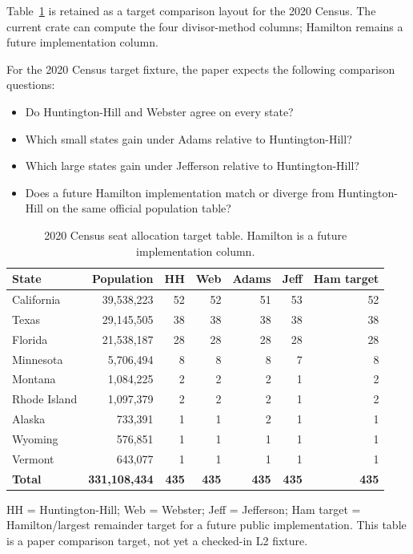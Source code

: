 \label{sec:comparison}

Table~\ref{tab:all-methods-2020} is retained as a target comparison layout for
the 2020 Census.  The current crate can compute the four divisor-method columns;
Hamilton remains a future implementation column.

For the 2020 Census target fixture, the paper expects the following comparison
questions:
\begin{itemize}
  \item Do Huntington-Hill and Webster agree on every state?
  \item Which small states gain under Adams relative to Huntington-Hill?
  \item Which large states gain under Jefferson relative to Huntington-Hill?
  \item Does a future Hamilton implementation match or diverge from
    Huntington-Hill on the same official population table?
\end{itemize}

\begin{table}[t]
\centering
\small
\caption{2020 Census seat allocation target table.
  Hamilton is a future implementation column.}
\label{tab:all-methods-2020}
\begin{tabular}{lrrrrrr}
\toprule
State & Population & HH & Web & Adams & Jeff & Ham target \\
\midrule
California  & 39,538,223 & 52 & 52 & 51 & 53 & 52 \\
Texas       & 29,145,505 & 38 & 38 & 38 & 38 & 38 \\
Florida     & 21,538,187 & 28 & 28 & 28 & 28 & 28 \\
Minnesota   &  5,706,494 &  8 &  8 &  8 &  7 &  8 \\
Montana     &  1,084,225 &  2 &  2 &  2 &  1 &  2 \\
Rhode Island & 1,097,379 &  2 &  2 &  2 &  1 &  2 \\
Alaska      &    733,391 &  1 &  1 &  2 &  1 &  1 \\
Wyoming     &    576,851 &  1 &  1 &  1 &  1 &  1 \\
Vermont     &    643,077 &  1 &  1 &  1 &  1 &  1 \\
\midrule
\textbf{Total} & \textbf{331,108,434} & \textbf{435} & \textbf{435} & \textbf{435} & \textbf{435} & \textbf{435} \\
\bottomrule
\end{tabular}
\begin{tablenotes}
\small
\item HH = Huntington-Hill; Web = Webster; Jeff = Jefferson; Ham target =
  Hamilton/largest remainder target for a future public implementation.
  This table is a paper comparison target, not yet a checked-in L2 fixture.
\end{tablenotes}
\end{table}

